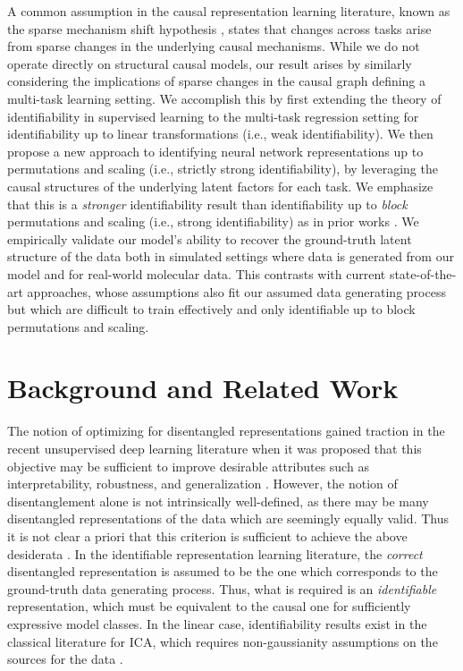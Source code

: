 \documentclass{article} %
\theoremstyle{plain}
\theoremstyle{definition}
\theoremstyle{remark}
\begin{document}
A common assumption in the causal representation learning literature, known as the sparse mechanism shift hypothesis \citep{scholkopf2019causality,scholkopf2021toward,perry2022causal}, states that changes across tasks arise from sparse changes in the underlying causal mechanisms. While we do not operate directly on structural causal models, our result arises by similarly considering the implications of sparse changes in the causal graph defining a multi-task learning setting. We accomplish this by first
extending the theory of identifiability in supervised learning to the multi-task regression setting for identifiability up to linear transformations (i.e., weak identifiability). We then propose a new approach to identifying neural network representations up to permutations and scaling (i.e., strictly strong identifiability), by leveraging the causal structures 
of the underlying latent factors for each task. We emphasize that this is a \textit{stronger} identifiability result than identifiability up to \textit{block} permutations and scaling (i.e., strong identifiability) as in prior works \citep{Khemakhem_Kingma_Monti_Hyvarinen_2020,Lu_Wu_Hernandez-Lobato_Scholkopf_2022}. 
We empirically validate our model's ability to recover the ground-truth latent structure of the data both in simulated settings where data is generated from our model and for real-world molecular data. This contrasts with current state-of-the-art approaches, whose assumptions also fit our assumed data generating process but which are difficult to train effectively and only identifiable up to block permutations and scaling.

\section{Background and Related Work}
\vspace{-0.75ex}
The notion of optimizing for disentangled representations gained traction in the recent unsupervised deep learning literature when it was proposed that this 
objective may be sufficient to improve desirable attributes such as interpretability, robustness, and generalization \citep{bengio2013representation,Higgins_Matthey_Pal_Burgess_Glorot_Botvinick_Mohamed_Lerchner_2017,chen2016infogan}. However, 
the notion of disentanglement alone is not intrinsically well-defined, as there may be many disentangled representations of the data which are seemingly equally valid. Thus it is not clear a priori that this criterion is sufficient to
achieve the above desiderata \citep{Locatello_Bauer_Lucic_Raetsch_Gelly_Scholkopf_Bachem_2019}. In the identifiable representation learning literature, the \textit{correct} disentangled representation is assumed to be the one 
which corresponds to the ground-truth data generating process. Thus, what is required is an \textit{identifiable} representation, which must be equivalent to the causal one for sufficiently expressive model classes. In the linear case, identifiability results exist 
in the classical literature for ICA, which requires non-gaussianity assumptions on the sources for the data \citep{Herault_Jutten_1986,Comon_1994}. 
\end{document}
